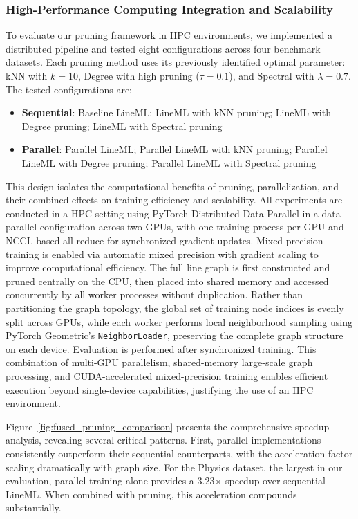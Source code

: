 \documentclass[pdflatex,sn-mathphys-num]{sn-jnl}%
\theoremstyle{thmstyleone}%
\theoremstyle{thmstyletwo}%
\theoremstyle{thmstylethree}%
\theoremstyle{plain} %
\theoremstyle{definition} %
\theoremstyle{remark} %
\theoremstyle{plain} %
\begin{document}
\subsubsection{High-Performance Computing Integration and Scalability}
\label{subsec:distributed_hpc}


To evaluate our pruning framework in HPC environments, we implemented a distributed pipeline and tested eight configurations across four benchmark datasets. 
Each pruning method uses its previously identified optimal parameter: kNN with $k=10$, Degree with high pruning ($\tau=0.1$), and Spectral with $\lambda=0.7$. 
The tested configurations are:
\begin{itemize}
    \item \textbf{Sequential}: Baseline LineML; LineML with kNN pruning; LineML with Degree pruning; LineML with Spectral pruning
    \item \textbf{Parallel}: Parallel LineML; Parallel LineML with kNN pruning; Parallel LineML with Degree pruning; Parallel LineML with Spectral pruning
\end{itemize}

This design isolates the computational benefits of pruning, parallelization, and their combined effects on training efficiency and scalability.
All experiments are conducted in a HPC setting using PyTorch Distributed Data Parallel in a data-parallel configuration across two GPUs, with one training process per GPU and NCCL-based all-reduce for synchronized gradient updates. 
Mixed-precision training is enabled via automatic mixed precision with gradient scaling to improve computational efficiency. 
The full line graph is first constructed and pruned centrally on the CPU, then placed into shared memory and accessed concurrently by all worker processes without duplication. 
Rather than partitioning the graph topology, the global set of training node indices is evenly split across GPUs, while each worker performs local neighborhood sampling using PyTorch Geometric’s \texttt{NeighborLoader}, preserving the complete graph structure on each device. 
Evaluation is performed after synchronized training. 
This combination of multi-GPU parallelism, shared-memory large-scale graph processing, and CUDA-accelerated mixed-precision training enables efficient execution beyond single-device capabilities, justifying the use of an HPC environment.



Figure~\ref{fig:fused_pruning_comparison} presents the comprehensive speedup analysis, revealing several critical patterns. 
First, parallel implementations consistently outperform their sequential counterparts, with the acceleration factor scaling dramatically with graph size. 
For the Physics dataset, the largest in our evaluation, parallel training alone provides a 3.23$\times$ speedup over sequential LineML. 
When combined with pruning, this acceleration compounds substantially.
\end{document}
